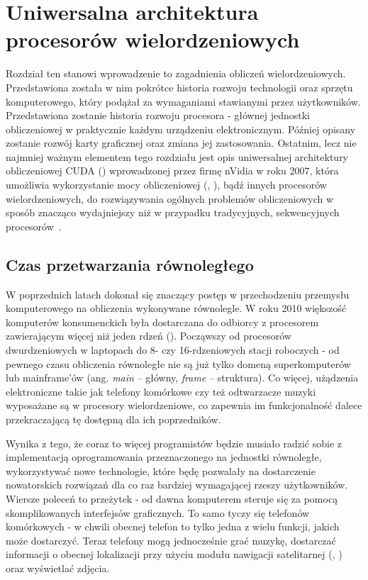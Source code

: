 \chapter{Uniwersalna architektura procesorów wielordzeniowych}
Rozdział ten stanowi wprowadzenie to zagadnienia obliczeń wielordzeniowych. Przedstawiona została w nim pokrótce historia rozwoju technologii oraz sprzętu komputerowego, który podążał za wymaganiami stawianymi przez użytkowników. Przedstawiona zostanie historia rozwoju procesora - głównej jednostki obliczeniowej w praktycznie każdym urządzeniu elektronicznym. Później opisany zostanie rozwój karty graficznej oraz zmiana jej zastosowania. Ostatnim, lecz nie najmniej ważnym elementem tego rozdziału jest opis uniwersalnej architektury obliczeniowej CUDA () wprowadzonej przez firmę nVidia w roku 2007, która umożliwia wykorzystanie mocy obliczeniowej  (, ), bądź innych procesorów wielordzeniowych, do rozwiązywania ogólnych problemów obliczeniowych w sposób znacząco wydajniejszy niż w przypadku tradycyjnych, sekwencyjnych procesorów~\cite{cuda:zone}.

\section{Czas przetwarzania równoległego}
W poprzednich latach dokonał się znaczący postęp w przechodzeniu przemysłu komputerowego na obliczenia wykonywane równolegle. W roku 2010 większość komputerów konsumenckich była dostarczana do odbiorcy z procesorem zawierającym więcej niż jeden rdzeń (). Począwszy od procesorów dwurdzeniowych w laptopach do 8- czy 16-rdzeniowych stacji roboczych - od pewnego czasu obliczenia równoległe nie są już tylko domeną superkomputerów lub mainframe'ów (ang. \emph{main} – główny, \emph{frame} – struktura). Co więcej, użądzenia elektroniczne takie jak telefony komórkowe czy też odtwarzacze muzyki wyposażane są w procesory wielordzeniowe, co zapewnia im funkcjonalność dalece przekraczającą tę dostępną dla ich poprzedników.

Wynika z tego, że coraz to więcej programistów będzie musiało radzić sobie z implementacją oprogramowania przeznaczonego na jednostki równoległe, wykorzystywać nowe technologie, które będę pozwalały na dostarczenie nowatorskich rozwiązań dla co raz bardziej wymagającej rzeszy użytkowników. Wiersze poleceń to przeżytek - od dawna komputerem steruje się za pomocą skomplikowanych interfejsów graficznych. To samo tyczy się telefonów komórkowych - w chwili obecnej telefon to tylko jedna z wielu funkcji, jakich może dostarczyć. Teraz telefony mogą jednocześnie grać muzykę, dostarczać informacji o obecnej lokalizacji przy użyciu modułu nawigacji satelitarnej (, ) oraz wyświetlać zdjęcia.

